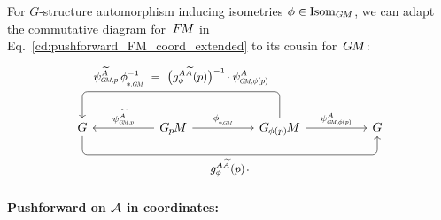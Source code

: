 For $G$-structure automorphism inducing isometries $\phi \in \operatorname{Isom}_{G\mkern-1.4muM}$, we can adapt the commutative diagram for~$F\mkern-1.5muM$ in Eq.~\eqref{cd:pushforward_FM_coord_extended} to its cousin for~$G\mkern-1.4muM$:
\begin{equation}\label{cd:pushforward_GM_coord_extended}
    \begin{tikzcd}[row sep=4.em, column sep=5em]
        G
            \arrow[rrr, pos=.5, rounded corners, to path={ 
                    -- ([yshift=-3.5ex]\tikztostart.south) 
                    --node[below]{\small$
                        g_\phi^{A\widetilde{A}}(p) \mkern2mu\cdot
                        $} ([yshift=-3.5ex]\tikztotarget.south) 
                    -- (\tikztotarget.south)
                    }]
        &
        \GpM
            \arrow[l, "\psiGMp^{\widetilde{A}}"']
            \arrow[r, "\dphiGM"]
        &
        \GphipM
            \arrow[r, "\psiGMphip^A"]
            \arrow[ll, pos=.5, rounded corners, to path={ 
                    -- ([yshift=5.ex]\tikztostart.north) 
                    --node[above]{\small$
                        \psiGMp^{\widetilde{A}}\, \dphiGM^{-1}\ =\ 
                        \big( g_\phi^{A\widetilde{A}}(p) \big)^{-1} \mkern-2mu\cdot \psiGMphip^A
                        $} ([yshift=5.ex]\tikztotarget.north) 
                    -- (\tikztotarget.north)
                    }]
        &
        G
    \end{tikzcd}
\end{equation}
















\paragraph{Pushforward on $\mathcal{A}$ in coordinates:}

